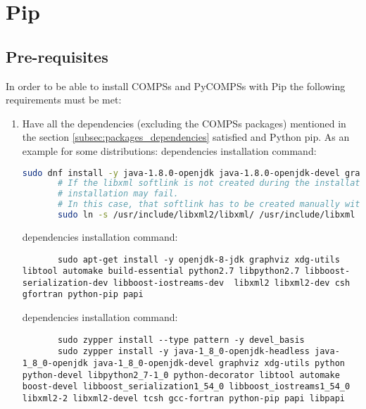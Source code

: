 \section{Pip}
\label{sec:Pip}

\subsection{Pre-requisites}
\label{subsec:pip_prerequisites}
In order to be able to install COMPSs and PyCOMPSs with Pip the following requirements must be met:
\begin{enumerate}
 \item Have all the dependencies (excluding the COMPSs packages) mentioned in the section \ref{subsec:packages_dependencies} satisfied and Python pip.
 As an example for some distributions:
    dependencies installation command:
     \begin{lstlisting}[language=bash]
       sudo dnf install -y java-1.8.0-openjdk java-1.8.0-openjdk-devel graphviz xdg-utils libtool automake python python-libs python-pip python-devel python2-decorator boost-devel boost-serialization boost-iostreams libxml2 libxml2-devel gcc gcc-c++ gcc-gfortran tcsh @development-tools redhat-rpm-config papi
       # If the libxml softlink is not created during the installation of libxml2, the COMPSs 
       # installation may fail.
       # In this case, that softlink has to be created manually with the following command:
       sudo ln -s /usr/include/libxml2/libxml/ /usr/include/libxml
     \end{lstlisting}
    dependencies installation command:
     \begin{lstlisting}
       sudo apt-get install -y openjdk-8-jdk graphviz xdg-utils libtool automake build-essential python2.7 libpython2.7 libboost-serialization-dev libboost-iostreams-dev  libxml2 libxml2-dev csh gfortran python-pip papi
     \end{lstlisting}   
    dependencies installation command:
     \begin{lstlisting}
       sudo zypper install --type pattern -y devel_basis
       sudo zypper install -y java-1_8_0-openjdk-headless java-1_8_0-openjdk java-1_8_0-openjdk-devel graphviz xdg-utils python python-devel libpython2_7-1_0 python-decorator libtool automake  boost-devel libboost_serialization1_54_0 libboost_iostreams1_54_0  libxml2-2 libxml2-devel tcsh gcc-fortran python-pip papi libpapi
     \end{lstlisting}

\end{enumerate}
